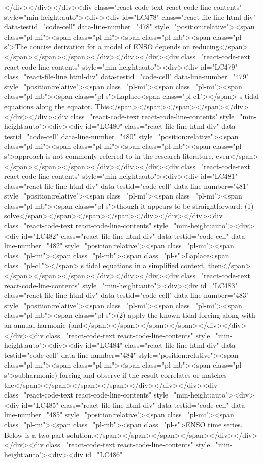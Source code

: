 {{{{{{{</div></div></div><div class="react-code-text react-code-line-contents" style="min-height:auto"><div><div id="LC478" class="react-file-line html-div" data-testid="code-cell" data-line-number="478" style="position:relative"><span class="pl-mi"><span class="pl-mi"><span class="pl-mb"><span class="pl-s">The concise derivation for a model of ENSO depends on reducing</span></span></span></span></div></div></div><div class="react-code-text react-code-line-contents" style="min-height:auto"><div><div id="LC479" class="react-file-line html-div" data-testid="code-cell" data-line-number="479" style="position:relative"><span class="pl-mi"><span class="pl-mi"><span class="pl-mb"><span class="pl-s">Laplace<span class="pl-c1">\textquotesingle</span> s tidal equations along the equator. This</span></span></span></span></div></div></div><div class="react-code-text react-code-line-contents" style="min-height:auto"><div><div id="LC480" class="react-file-line html-div" data-testid="code-cell" data-line-number="480" style="position:relative"><span class="pl-mi"><span class="pl-mi"><span class="pl-mb"><span class="pl-s">approach is not commonly referred to in the research literature, even</span></span></span></span></div></div></div><div class="react-code-text react-code-line-contents" style="min-height:auto"><div><div id="LC481" class="react-file-line html-div" data-testid="code-cell" data-line-number="481" style="position:relative"><span class="pl-mi"><span class="pl-mi"><span class="pl-mb"><span class="pl-s">though it appears to be straightforward: (1) solve</span></span></span></span></div></div></div><div class="react-code-text react-code-line-contents" style="min-height:auto"><div><div id="LC482" class="react-file-line html-div" data-testid="code-cell" data-line-number="482" style="position:relative"><span class="pl-mi"><span class="pl-mi"><span class="pl-mb"><span class="pl-s">Laplace<span class="pl-c1">\textquotesingle</span> s tidal equations in a simplified context, then</span></span></span></span></div></div></div><div class="react-code-text react-code-line-contents" style="min-height:auto"><div><div id="LC483" class="react-file-line html-div" data-testid="code-cell" data-line-number="483" style="position:relative"><span class="pl-mi"><span class="pl-mi"><span class="pl-mb"><span class="pl-s">(2) apply the known tidal forcing along with an annual harmonic (and</span></span></span></span></div></div></div><div class="react-code-text react-code-line-contents" style="min-height:auto"><div><div id="LC484" class="react-file-line html-div" data-testid="code-cell" data-line-number="484" style="position:relative"><span class="pl-mi"><span class="pl-mi"><span class="pl-mb"><span class="pl-s">subharmonic) forcing and observe if the result correlates or matches the</span></span></span></span></div></div></div><div class="react-code-text react-code-line-contents" style="min-height:auto"><div><div id="LC485" class="react-file-line html-div" data-testid="code-cell" data-line-number="485" style="position:relative"><span class="pl-mi"><span class="pl-mi"><span class="pl-mb"><span class="pl-s">ENSO time series. Below is a two part solution.</span></span></span></span></div></div></div><div class="react-code-text react-code-line-contents" style="min-height:auto"><div><div id="LC486" }}}}}}}
